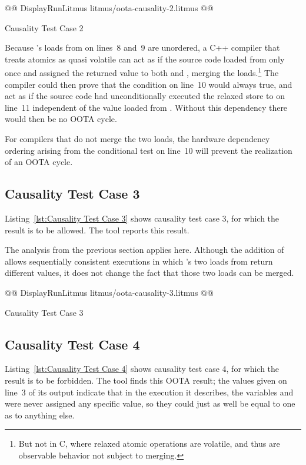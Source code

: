 \documentclass[10]{article}
\begin{document}
\begin{listing}[tbp]
@@ DisplayRunLitmus litmus/oota-causality-2.litmus @@
\caption{Causality Test Case 2}
\label{lst:Causality Test Case 2}
\end{listing}

Because 's loads from  on lines~8 and~9 are unordered,
a C++ compiler that treats atomics as quasi volatile
can act as if the source code loaded from  only
once and assigned the returned value to both  and ,
merging the loads.\footnote{
	But not in C, where relaxed atomic operations are volatile,
	and thus are observable behavior not subject to merging.}
The compiler could then prove that the condition on line~10
would always true, and act as if the source code had
unconditionally executed the relaxed store to  on line~11
independent of the value loaded from .
Without this dependency there would then be no OOTA cycle.

For compilers that do not merge the two loads, the hardware
dependency ordering arising from the conditional test on line~10
will prevent the realization of an OOTA cycle.

\subsection{Causality Test Case 3}
\label{app:Causality Test Case 3}

Listing~\ref{lst:Causality Test Case 3}
shows causality test case 3, for which the  result
is to be allowed.
The  tool reports this result.

The analysis from the previous section applies here.
Although the addition of  allows sequentially consistent executions
in which 's two loads from  return different values,
it does not change the fact that those two loads can be merged.

\begin{listing}[tbp]
@@ DisplayRunLitmus litmus/oota-causality-3.litmus @@
\caption{Causality Test Case 3}
\label{lst:Causality Test Case 3}
\end{listing}

\subsection{Causality Test Case 4}
\label{app:Causality Test Case 4}

Listing~\ref{lst:Causality Test Case 4}
shows causality test case 4, for which the  result
is to be forbidden.
The  tool finds this OOTA result;
the  values given on line~3 of its output indicate
that in the execution it describes, the variables  and~ were never
assigned any specific value, so they could just as well be equal to
one as to anything else.
\end{document}
